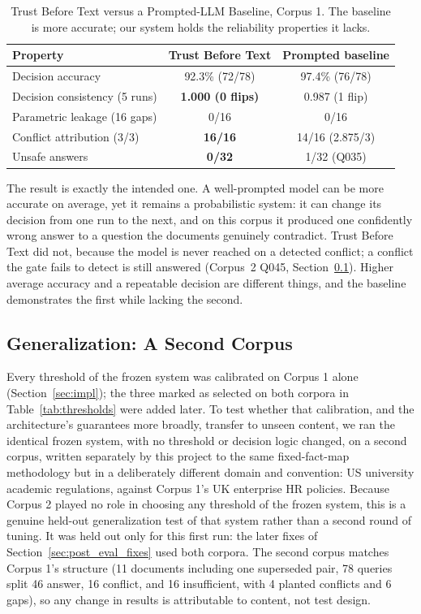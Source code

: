\documentclass[conference]{IEEEtran}
\begin{document}
\begin{table}[htbp]
\caption{Trust Before Text versus a Prompted-LLM Baseline, Corpus 1. The
baseline is more accurate; our system holds the reliability properties it
lacks.}
\label{tab:headtohead}
\centering
\small
\begin{tabularx}{\columnwidth}{@{}X c c@{}}
\toprule
Property & Trust Before Text & Prompted baseline \\
\midrule
Decision accuracy              & 92.3\% (72/78)      & 97.4\% (76/78) \\
Decision consistency (5 runs)  & \textbf{1.000 (0 flips)} & 0.987 (1 flip) \\
Parametric leakage (16 gaps)   & 0/16                & 0/16 \\
Conflict attribution (3/3)     & \textbf{16/16}      & 14/16 (2.875/3) \\
Unsafe answers                 & \textbf{0/32}       & 1/32 (Q035) \\
\bottomrule
\end{tabularx}
\end{table}

The result is exactly the intended one. A well-prompted model can be more
accurate on average, yet it remains a probabilistic system: it can change
its decision from one run to the next, and on this corpus it produced one
confidently wrong answer to a question the documents genuinely contradict.
Trust Before Text did not, because the model is never reached on a detected
conflict; a conflict the gate fails to detect is still answered (Corpus~2
Q045, Section~\ref{sec:corpus2}). Higher average accuracy and a repeatable
decision are different things, and the baseline demonstrates the first while
lacking the second.

\subsection{Generalization: A Second Corpus}
\label{sec:corpus2}
Every threshold of the frozen system was calibrated on Corpus 1 alone
(Section~\ref{sec:impl}); the three marked as selected on both corpora in
Table~\ref{tab:thresholds} were added later. To test whether that calibration, and the
architecture's guarantees more broadly, transfer to unseen content, we ran
the identical frozen system, with no threshold or decision logic changed,
on a second corpus, written separately by this project to the same fixed-fact-map
methodology but in a deliberately different domain and convention: US
university academic regulations, against Corpus 1's UK enterprise HR
policies. Because Corpus 2 played no role in choosing any threshold of the frozen
system, this is a genuine held-out generalization test of that system rather
than a second round of tuning. It was held out only for this first run: the
later fixes of Section~\ref{sec:post_eval_fixes} used both corpora.
The second corpus matches Corpus 1's structure
(11 documents including one superseded pair, 78 queries split 46 answer, 16
conflict, and 16 insufficient, with 4 planted conflicts and 6 gaps), so any
change in results is attributable to content, not test design.
\end{document}
